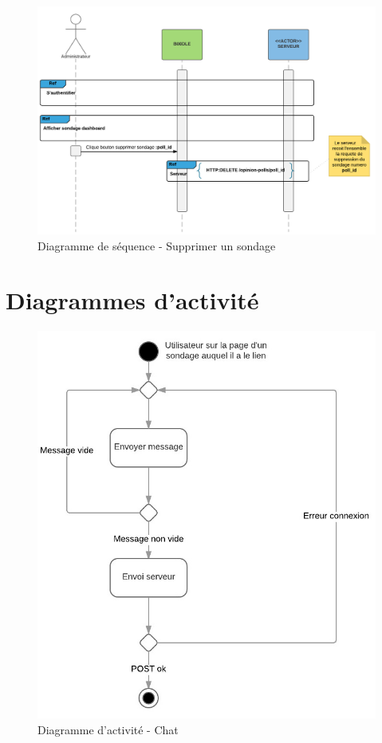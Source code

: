 \documentclass[titlepage]{report}
\begin{document}
\begin{figure}[h]
	\caption{Diagramme de séquence - Supprimer un sondage}
	\label{annexe_diagramme_sequence_supprimerSondage}
	\centering
	\includegraphics[width=\textwidth]{figures/diagrammes/sequence_supprimerSondage.png}
\end{figure}

\clearpage
\chapter{Diagrammes d'activité}

\begin{figure}[h]
	\caption{Diagramme d'activité - Chat}
	\label{annexe_diagramme_activite_Chat}
	\centering
	\includegraphics[scale=1]{figures/diagrammes/activite_Chat.png}
\end{figure}
\end{document}
